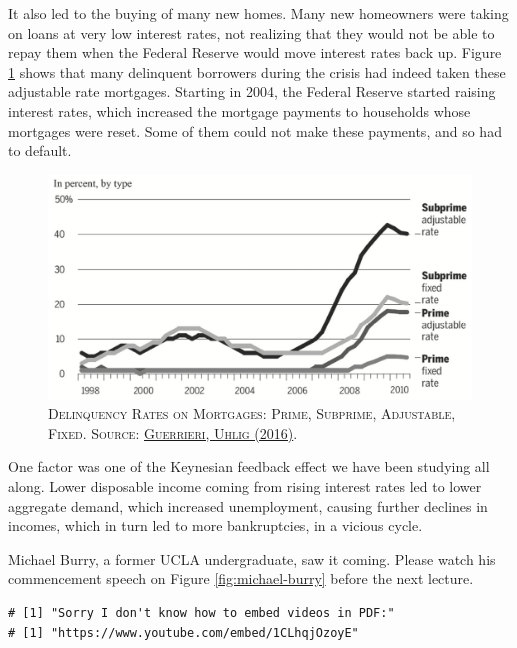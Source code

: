 \documentclass[]{book}
\begin{document}
It also led to the buying of many new homes. Many new homeowners were
taking on loans at very low interest rates, not realizing that they
would not be able to repay them when the Federal Reserve would move
interest rates back up. Figure \ref{fig:GuerrieriUhlig2016-fig16-small}
shows that many delinquent borrowers during the crisis had indeed taken
these adjustable rate mortgages. Starting in 2004, the Federal Reserve
started raising interest rates, which increased the mortgage payments to
households whose mortgages were reset. Some of them could not make these
payments, and so had to default.






\begin{figure}

{\centering \includegraphics[width=1\linewidth,height=1\textheight]{figures/GuerrieriUhlig2016-fig16-small} 

}

\caption{\textsc{Delinquency Rates on
Mortgages: Prime, Subprime, Adjustable, Fixed. Source:
\href{https://doi.org/10.1016/bs.hesmac.2016.06.001}{Guerrieri, Uhlig
(2016)}}.}\label{fig:GuerrieriUhlig2016-fig16-small}
\end{figure}

One factor was one of the Keynesian feedback effect we have been
studying all along. Lower disposable income coming from rising interest
rates led to lower aggregate demand, which increased unemployment,
causing further declines in incomes, which in turn led to more
bankruptcies, in a vicious cycle.

Michael Burry, a former UCLA undergraduate, saw it coming. Please watch
his commencement speech on Figure \ref{fig:michael-burry} before the
next lecture.




\begin{verbatim}
# [1] "Sorry I don't know how to embed videos in PDF:"
# [1] "https://www.youtube.com/embed/1CLhqjOzoyE"
\end{verbatim}
\end{document}
